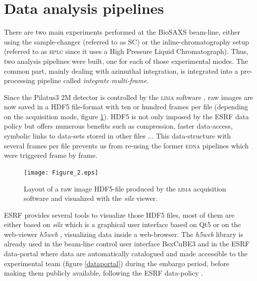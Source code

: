 \documentclass[preprint]{iucr}              %
\begin{document}
\section{Data analysis pipelines}
\label{pipeline}
There are two main experiments performed at the BioSAXS beam-line, either using the sample-changer (referred to as SC) or the inline-chromatography setup (referred to as \textsc{hplc} since it uses a High Pressure Liquid Chromatograph).
Thus, two analysis pipelines were built, one for each of those experimental modes.
The common part, mainly dealing with azimuthal integration, is integrated into a pre-processing pipeline called \textit{integrate multi-frame}.

Since the Pilatus3 2M detector is controlled by the \textsc{lima} software \cite{lima}, raw images are now saved in a HDF5 file-format \cite{hdf5} with ten or hundred frames per file (depending on the acquisition mode, figure \ref{lima}).
HDF5 is not only imposed by the ESRF data policy  \cite{data-policy} but offers numerous benefits such as compression, faster data-access, symbolic links to data-sets stored in other files ...
This data-structure with several frames per file prevents us from re-using the former \textsc{edna} pipelines which were triggered frame by frame.

\begin{figure}
     \caption{Layout of a raw image HDF5-file produced by the \textsc{lima} acquisition software and visualized with the \textit{silx} viewer.}
     \texttt{[image: Figure\_2.eps]}
     \label{lima}
\end{figure}

ESRF provides several tools to visualize those HDF5 files, most of them are either based on \textit{silx} \cite{silx} which is a graphical user interface based on Qt5 \cite{pyqt} or on the web-viewer \textit{h5web} \cite{h5web}, visualizing data inside a web-browser.
The \textit{h5web} library is already used in the beam-line control user interface BsxCuBE3 \cite{bm29_2022} and in the ESRF data-portal \cite{data-portal} where data are automatically catalogued and made accessible to the experimental team (figure \ref{dataportal}) during the embargo period, before making them publicly available, following the ESRF data-policy \cite{data-policy}. 
\end{document}
